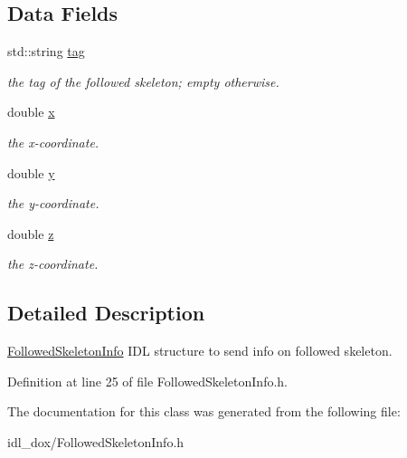 \subsection*{Data Fields}
\begin{DoxyCompactItemize}
\item 
\mbox{\label{classFollowedSkeletonInfo_a6e749fa0208ef825c6b40ad6bbf825d4}} 
std\+::string \mbox{\hyperlink{classFollowedSkeletonInfo_a6e749fa0208ef825c6b40ad6bbf825d4}{tag}}
\begin{DoxyCompactList}\small\item\em the tag of the followed skeleton; empty otherwise. \end{DoxyCompactList}\item 
\mbox{\label{classFollowedSkeletonInfo_aa73a5373607a251d22f2fdb6078ee365}} 
double \mbox{\hyperlink{classFollowedSkeletonInfo_aa73a5373607a251d22f2fdb6078ee365}{x}}
\begin{DoxyCompactList}\small\item\em the x-\/coordinate. \end{DoxyCompactList}\item 
\mbox{\label{classFollowedSkeletonInfo_af988aa2cef6f97786677c2fe402def20}} 
double \mbox{\hyperlink{classFollowedSkeletonInfo_af988aa2cef6f97786677c2fe402def20}{y}}
\begin{DoxyCompactList}\small\item\em the y-\/coordinate. \end{DoxyCompactList}\item 
\mbox{\label{classFollowedSkeletonInfo_a83222015ccfa4b8865f935d6ef777717}} 
double \mbox{\hyperlink{classFollowedSkeletonInfo_a83222015ccfa4b8865f935d6ef777717}{z}}
\begin{DoxyCompactList}\small\item\em the z-\/coordinate. \end{DoxyCompactList}\end{DoxyCompactItemize}


\subsection{Detailed Description}
\mbox{\hyperlink{classFollowedSkeletonInfo}{Followed\+Skeleton\+Info}} I\+DL structure to send info on followed skeleton. 

Definition at line 25 of file Followed\+Skeleton\+Info.\+h.



The documentation for this class was generated from the following file\+:\begin{DoxyCompactItemize}
\item 
idl\+\_\+dox/Followed\+Skeleton\+Info.\+h\end{DoxyCompactItemize}
